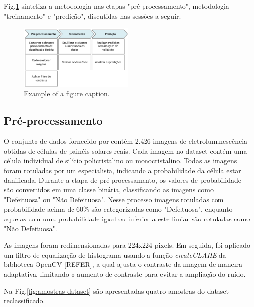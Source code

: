 \documentclass[conference]{IEEEtran}
\begin{document}
Fig.\ref{fig:metodologia} sintetiza a metodologia nas etapas
"pré-processamento", metodologia
"treinamento" e "predição", discutidas nas sessões a seguir.
\begin{figure}[htbp]
    \centerline{\includegraphics[width=0.5\textwidth]{images/metodologia.png}}
    \caption{Example of a figure caption.}
    \label{fig:metodologia}
\end{figure}

\subsection{Pré-processamento}\label{AA}

O conjunto de dados fornecido por \cite{Deitsch2021} contêm 2.426 imagens de
eletroluminescência obtidas de células de painéis
solares reais. Cada imagem no dataset contém uma célula individual de silício
policristalino ou monocristalino. Todas as imagens foram rotuladas por um
especialista,
indicando a probabilidade da célula estar danificada.
Durante a etapa de pré-processamento, os valores de
probabilidade são convertidos em uma classe binária, classificando as imagens
como "Defeituosa" ou "Não Defeituosa". Nesse processo imagens rotuladas com
probabilidade acima de 60\% são categorizadas como "Defeituosa", enquanto
aquelas com uma probabilidade igual ou inferior a este limiar são rotuladas
como "Não Defeituosa".

As imagens foram redimensionadas para
224x224 pixels. Em seguida, foi aplicado um filtro de equalização de histograma
usando a função \textit{createCLAHE} da biblioteca OpenCV [REFER], a qual
ajusta o contraste da imagem de maneira adaptativa, limitando o aumento de
contraste para evitar a ampliação do ruído.

Na Fig.\ref{fig:amostras-dataset} são apresentadas quatro amostras do dataset
reclassificado.
\end{document}
